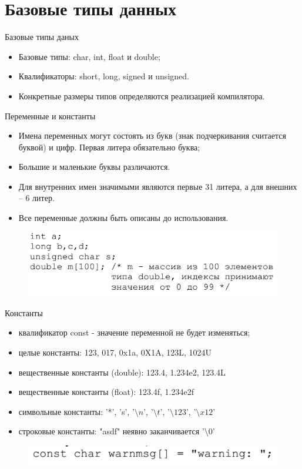 \documentclass{beamer}
\begin{document}
\section{Базовые типы данных}
\begin{frame}{Базовые типы даных}
\begin{itemize}
\item Базовые типы: char, int, float и double;
\item Квалификаторы: short, long, signed и unsigned.
\item Конкретные размеры типов определяются реализацией компилятора.
\end{itemize}
\end{frame} 

\begin{frame}{Переменные и константы}
\begin{itemize}
\item Имена переменных могут состоять из букв (знак подчеркивания считается буквой) и цифр. Первая литера обязательно буква;
\item Большие и маленькие буквы различаются.
\item Для внутренних имен значимыми являются первые 31 литера, а для внешних – 6 литер.
\item Все переменные должны быть описаны до использования.
\end{itemize}
\begin{figure}[h]
\centering
\includegraphics[scale=0.6]{images/lec02-pic01.png}
\end{figure}
\end{frame}

\begin{frame}{Константы}
\begin{itemize}
\item квалификатор const - значение переменной не будет изменяться;
\item целые константы: 123, 017, 0x1a, 0X1A, 123L, 1024U
\item вещественные константы (double): 123.4, 1.234e2, 123.4L
\item вещественные константы (float): 123.4f, 1.234e2f
\item символьные константы: '*', 's', '$\setminus n$', '$\setminus t$', '$\setminus 123$', '$\setminus x12$'
\item строковые константы: "asdf"  неявно заканчивается '$\setminus 0$'
\end{itemize}
\begin{figure}[h]
\centering
\includegraphics[scale=0.6]{images/lec02-pic02.png}
\end{figure}
\end{frame}
\end{document}
